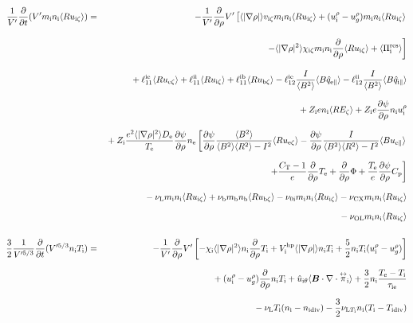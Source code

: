 \documentclass[11pt]{article}
\def\bvec#1{\leavevmode\hbox{\boldmath$#1$}}
\let\vec=\bvec
\def\r#1{{\rm#1}}
\def\aves#1{\langle#1\rangle}
\def\dd#1#2{\frac{\partial #1}{\partial #2}}
\def\tensor#1{\mathord{\displaystyle\mathop{#1}^\leftrightarrow}}
\def\para{\parallel}
\def\ddrho{\frac{\partial}{\partial\rho}}
\def\mi{m_\r{i}}
\def\mb{m_\r{b}}
\def\nee{n_\r{e}}
\def\ni{n_\r{i}}
\def\nb{n_\r{b}}
\def\Te{T_\r{e}}
\def\Ti{T_\r{i}}
\def\Zi{Z_\r{i}}
\def\uezt{u_{\r{e}\zeta}}
\def\uizt{u_{\r{i}\zeta}}
\def\ubzt{u_{\r{b}\zeta}}
\def\uepara{u_{\r{e}\para}}
\def\ubpara{u_{\r{b}\para}}
\def\qhatepara{\hat{q}_{\r{e}\para}}
\def\qhatipara{\hat{q}_{\r{i}\para}}
\def\uirho{u_\r{i}^\rho}
\def\ugrho{u_{g}^\rho}
\def\chii{\chi_\r{i}}
\def\bri{\aves{B^2}\aves{R^2} - I^2}
\def\ddt{\frac{\partial}{\partial t}}
\def\De{D_\r{e}}
\def\nuni{\nu_\r{0i}}
\def\nuL{\nu_\r{L}}
\def\nuCX{\nu_\r{CX}}
\def\nub{\nu_\r{b}}
\def\nidiv{n_\r{idiv}}
\def\Tidiv{T_\r{idiv}}
\def\nuLTi{\nu_{\r{L}T_\r{i}}}
\def\nuOL{\nu_\r{OL}}
\begin{document}
\begin{eqnarray}
\\[5mm]
 \frac{1}{V'} \ddt (V' \mi \ni \aves{R \uizt}) &=&
%
  - \frac{1}{V'} \ddrho V' \left[  \aves{|\nabla\rho|} v_{\r{i}\zeta} \mi \ni \aves{R \uizt}
			       +   (\uirho - \ugrho) \mi \ni \aves{R \uizt} \right.
\nonumber\\[3mm]&&{}
                        \left. - \aves{|\nabla\rho|^2} \chi_{\r{i}\zeta} \mi \ni
			         \ddrho \aves{R \uizt}
                               + \aves{\Pi_\r{i}^\r{res}} \right]
\nonumber\\[3mm]&&{}
%
  + \ell_{11}^\r{ie} \aves{R \uezt}
  + \ell_{11}^\r{ii} \aves{R \uizt}
  + \ell_{11}^\r{ib} \aves{R \ubzt}
%
  - \ell_{12}^\r{ie} \frac{I}{\aves{B^2}} \aves{B \qhatepara}
  - \ell_{12}^\r{ii} \frac{I}{\aves{B^2}} \aves{B \qhatipara}
\nonumber\\[2.5mm]&&{}
%
  + \Zi e                 \ni \aves{R E_\zeta}
%
  + \Zi e \dd{\psi}{\rho} \ni \uirho
%
\nonumber\\[2.5mm]&&{}
%
%
  + \Zi \frac{e^2 \aves{|\nabla\rho|^2} \De}{\Te} \dd{\psi}{\rho} \nee
    \left[  \dd{\psi}{\rho} \frac{\aves{B^2}}{\bri} \aves{R \uezt}
          - \dd{\psi}{\rho} \frac{I}{\bri} \aves{B \uepara} \right.
\nonumber\\[2.5mm]&&{}
    \left.+ \frac{C_\r{T}-1}{e} \ddrho \Te
	  + \ddrho \Phi
	  + \frac{\Te}{e} \dd{\psi}{\rho} C_\r{p} \right]
\nonumber\\[2.5mm]&&{}
%
  - \nuL  \mi \ni \aves{R \uizt}
%
  + \nub  \mb \nb \aves{R \ubzt}
%
  - \nuni \mi \ni \aves{R \uizt}
%
  - \nuCX \mi \ni \aves{R \uizt}
\nonumber\\[2.5mm]&&{}
%
  - \nuOL \mi \ni \aves{R \uizt}
\\[5mm]
 \frac{3}{2}\frac{1}{V'^{5/3}} \ddt (V'^{5/3} \ni \Ti ) &=& 
%
  - \frac{1}{V'} \ddrho V'
    \left[ - \chii          \aves{|\nabla\rho|^2} \ni \ddrho \Ti
           + V_\r{i}^\r{hp} \aves{|\nabla\rho|}   \ni \Ti
           + \frac{5}{2} \ni \Ti ( \uirho - \ugrho ) \right]
\nonumber\\[2.5mm]&&{}
%
  + ( \uirho - \ugrho ) \ddrho \ni \Ti
%
  + \hat{u}_{\r{i}\theta} \aves{\vec{B}\cdot\nabla\cdot\tensor{\pi}_\r{i}}
%
  + \frac{3}{2} \ni \frac{ \Te - \Ti }{\tau_\r{ie}}
\nonumber\\[2.5mm]&&{}
%
  - \nuL \Ti (\ni - \nidiv)
%
  - \frac{3}{2} \nuLTi \ni (\Ti - \Tidiv)
%
\nonumber\\[2.5mm]&&{}

\end{eqnarray}
\end{document}
